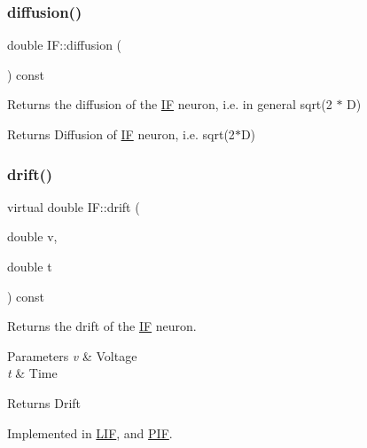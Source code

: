 \subsubsection{\texorpdfstring{diffusion()}{diffusion()}}
{\footnotesize\ttfamily double I\+F\+::diffusion (\begin{DoxyParamCaption}{ }\end{DoxyParamCaption}) const}



Returns the diffusion of the \hyperlink{classIF}{IF} neuron, i.\+e. in general sqrt(2 $\ast$ D) 

\begin{DoxyReturn}{Returns}
Diffusion of \hyperlink{classIF}{IF} neuron, i.\+e. sqrt(2$\ast$\+D) 
\end{DoxyReturn}
\mbox{\label{classIF_aa8a7a38f8fa3aa013df026734d02784c}} 
\subsubsection{\texorpdfstring{drift()}{drift()}}
{\footnotesize\ttfamily virtual double I\+F\+::drift (\begin{DoxyParamCaption}\item[{double}]{v,  }\item[{double}]{t }\end{DoxyParamCaption}) const\hspace{0.3cm}{\ttfamily [pure virtual]}}



Returns the drift of the \hyperlink{classIF}{IF} neuron. 


\begin{DoxyParams}{Parameters}
{\em v} & Voltage \\
\hline
{\em t} & Time \\
\hline
\end{DoxyParams}
\begin{DoxyReturn}{Returns}
Drift 
\end{DoxyReturn}


Implemented in \hyperlink{classLIF_a9b298ddf01f78240748137c3328fb1b7}{L\+IF}, and \hyperlink{classPIF_a12aaacff008d1366ddb6fc3ca0e3ed51}{P\+IF}.

\mbox{\label{classIF_a35bb1a822891b3c17fd4b35db839c398}} 
